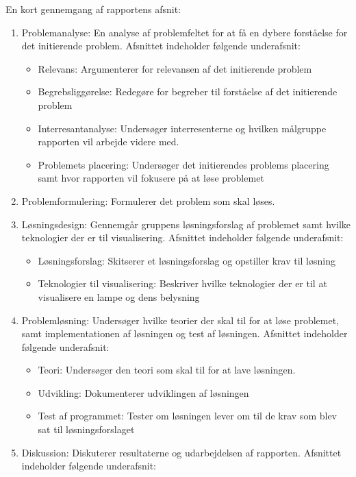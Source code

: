 En kort gennemgang af rapportens afsnit:
\begin{enumerate}
\item Problemanalyse: En analyse af problemfeltet for at få en dybere forståelse for det initierende problem. Afsnittet indeholder følgende underafsnit:
  \begin{itemize}
    \item Relevans: Argumenterer for relevansen af det initierende problem
    \item Begrebsliggørelse: Redegøre for begreber til forståelse af det initierende problem
    \item Interresantanalyse: Undersøger interresenterne og hvilken målgruppe rapporten vil arbejde videre med.
    \item Problemets placering: Undersøger det initierendes problems placering samt hvor rapporten vil fokusere på at løse problemet
  \end{itemize}
\item Problemformulering: Formulerer det problem som skal løses.
\item Løsningsdesign: Gennemgår gruppens løsningsforslag af problemet samt hvilke teknologier der er til visualisering. Afsnittet indeholder følgende underafsnit: 
  \begin{itemize}
    \item Løsningsforslag: Skitserer et løsningsforslag og opstiller krav til løsning
    \item Teknologier til visualisering: Beskriver hvilke teknologier der er til at visualisere en lampe og dens belysning
  \end{itemize}
\item Problemløsning: Undersøger hvilke teorier der skal til for at løse problemet, samt implementationen af løsningen og test af løsningen. Afsnittet indeholder følgende underafsnit:
  \begin{itemize}
    \item Teori: Undersøger den teori som skal til for at lave løsningen.
    \item Udvikling: Dokumenterer udviklingen af løsningen
    \item Test af programmet: Tester om løsningen lever om til de krav som blev sat til løsningsforslaget
  \end{itemize}
\item Diskussion: Diskuterer resultaterne og udarbejdelsen af rapporten. Afsnittet indeholder følgende underafsnit:
  \begin{itemize}

\end{itemize}
\end{enumerate}
